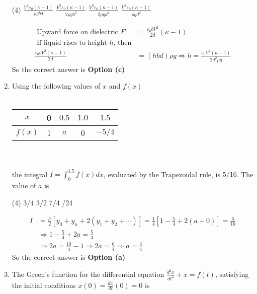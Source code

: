 \begin{enumerate}
 \begin{tasks}(4)
	\task[\textbf{a.}]$\frac{V^{2} \varepsilon_{0}(\kappa-1)}{\rho g b d}$
	\task[\textbf{b.}]$\frac{V^{2} \varepsilon_{0}(\kappa-1)}{2 \rho g b^{2}}$
	\task[\textbf{c.}]$\frac{V^{2} \varepsilon_{0}(\kappa-1)}{2 \rho g d^{2}}$
	\task[\textbf{d.}] $\frac{V^{2} \varepsilon_{0}(\kappa-1)}{\rho g d^{2}}$
\end{tasks}
\begin{answer}
	\begin{align*}
	\text { Upward force on dielectric } F&=\frac{\varepsilon_{0} b V^{2}}{2 d}(\kappa-1)\\
\text{	If liquid rises to height $h$, then}\\
	\frac{\varepsilon_{0} b V^{2}(\kappa-1)}{2 d}&=(h b d) \rho g \Rightarrow h=\frac{\varepsilon_{0} V^{2}(\kappa-1)}{2 d^{2} \rho g}
	\end{align*}
	So the correct answer is \textbf{Option (c)}
\end{answer}
\item  Using the following values of $x$ and $f(x)$\\\\
\begin{tabular}{|c|c|c|c|c|}
	\hline$x$ & 0 & $0.5$ & $1.0$ & $1.5$ \\
	\hline$f(x)$ & 1 & $a$ & 0 & $-5 / 4$ \\
	\hline
\end{tabular}\\\\
the integral $I=\int_{0}^{1.5} f(x) d x$, evaluated by the Trapezoidal rule, is $5 / 16$. The value of $a$ is
 \begin{tasks}(4)
	\task[\textbf{a.}]$3 / 4$
	\task[\textbf{b.}]$3 / 2$
	\task[\textbf{c.}] $7 / 4$
	/24
\end{tasks}
\begin{answer}
	\begin{align*}
	I&=\frac{h}{2}\left[y_{0}+y_{n}+2\left(y_{1}+y_{2}+\cdots\right)\right]=\frac{1}{4}\left[1-\frac{5}{4}+2(a+0)\right]=\frac{5}{16}\\
	&\Rightarrow 1-\frac{5}{4}+2 a=\frac{5}{4} \\
	&\Rightarrow 2 a=\frac{10}{4}-1 \Rightarrow 2 a=\frac{6}{4} \Rightarrow a=\frac{3}{4}
	\end{align*}
		So the correct answer is \textbf{Option (a)}
\end{answer}
\item The Green's function for the differential equation $\frac{d^{2} x}{d t^{2}}+x=f(t)$, satisfying the initial conditions $x(0)=\frac{d x}{d t}(0)=0$ is

\end{enumerate}
